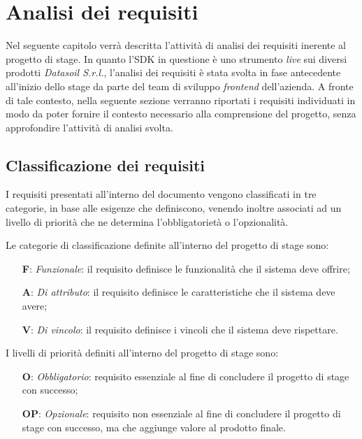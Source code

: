 \chapter{Analisi dei requisiti}
\label{chap:analisi-requisiti}
Nel seguente capitolo verrà descritta l'attività di analisi dei requisiti inerente al progetto di stage. \newline
In quanto l'SDK in questione è uno strumento \textit{live} sui diversi prodotti \textit{Datasoil S.r.l.}, l'analisi dei requisiti è stata svolta
in fase antecedente all'inizio dello stage da parte del team di sviluppo \textit{\gls{frontend}\glox} dell'azienda. \newline
A fronte di tale contesto, nella seguente sezione verranno riportati i requisiti individuati in modo da poter fornire il contesto
necessario alla comprensione del progetto, senza approfondire l'attività di analisi svolta.

\section{Classificazione dei requisiti}
I requisiti presentati all'interno del documento vengono classificati in tre categorie, in base alle esigenze che definiscono, venendo inoltre
associati ad un livello di priorità che ne determina l'obbligatorietà o l'opzionalità. \newline

\newline
Le categorie di classificazione definite all'interno del progetto di stage sono:

\begin{itemize}
    \item[\textbf{F}:] \textit{Funzionale}: il requisito definisce le funzionalità che il sistema deve offrire;
    \item[\textbf{A}:] \textit{Di attributo}: il requisito definisce le caratteristiche che il sistema deve avere;
    \item[\textbf{V}:] \textit{Di vincolo}: il requisito definisce i vincoli che il sistema deve rispettare.
\end{itemize}

\newline
I livelli di priorità definiti all'interno del progetto di stage sono:

\begin{itemize}
    \item[\textbf{O}:] \textit{Obbligatorio}: requisito essenziale al fine di concludere il progetto di stage con successo;
    \item[\textbf{OP}:] \textit{Opzionale}: requisito non essenziale al fine di concludere il progetto di stage con successo, ma che aggiunge valore al prodotto finale.
\end{itemize}

